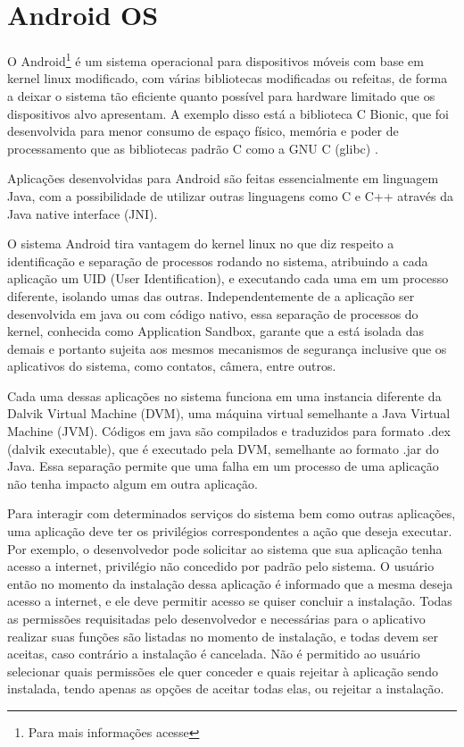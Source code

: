 \chapter{Android OS}
\label{cap:android-os}

O Android\footnote{Para mais informações acesse } é um sistema operacional para dispositivos móveis com base em kernel linux modificado, com várias bibliotecas modificadas ou refeitas, de forma a deixar o sistema tão eficiente quanto possível para hardware limitado que os dispositivos alvo apresentam. A exemplo disso está a biblioteca C Bionic, que foi desenvolvida para menor consumo de espaço físico, memória e poder de processamento que as bibliotecas padrão C como a GNU C (glibc) \cite{devos2014}. 

Aplicações desenvolvidas para Android são feitas essencialmente em linguagem Java, com a possibilidade de utilizar outras linguagens como C e C++ através da Java native interface (JNI). 

O sistema Android tira vantagem do kernel linux no que diz respeito a identificação e separação de processos rodando no sistema, atribuindo a cada aplicação um UID (User Identification), e executando cada uma em um processo diferente, isolando umas das outras.  Independentemente de a aplicação ser desenvolvida em java ou com código nativo, essa separação de processos do kernel, conhecida como Application Sandbox, garante que a está isolada das demais e portanto sujeita aos mesmos mecanismos de segurança inclusive que os aplicativos do sistema, como contatos, câmera, entre outros. 

Cada uma dessas aplicações no sistema funciona em uma instancia diferente da Dalvik Virtual Machine (DVM), uma máquina virtual semelhante a Java Virtual Machine (JVM). Códigos em java são compilados e traduzidos para formato .dex (dalvik executable), que é executado pela DVM, semelhante ao formato .jar do Java. Essa separação permite que uma falha em um processo de uma aplicação não tenha impacto algum em outra aplicação. 

Para interagir com determinados serviços do sistema bem como outras aplicações, uma aplicação deve ter os privilégios correspondentes a ação que deseja executar. Por exemplo, o desenvolvedor pode solicitar ao sistema que sua aplicação tenha acesso a internet, privilégio não concedido por padrão pelo sistema. O usuário então no momento da instalação dessa aplicação é informado que a mesma deseja acesso a internet, e ele deve permitir acesso se quiser concluir a instalação. Todas as permissões requisitadas pelo desenvolvedor e necessárias para o aplicativo realizar suas funções são listadas no momento de instalação, e todas devem ser aceitas, caso contrário a instalação é cancelada. Não é permitido ao usuário selecionar quais permissões ele quer conceder e quais rejeitar à aplicação sendo instalada, tendo apenas as opções de aceitar todas elas, ou rejeitar a instalação. 

